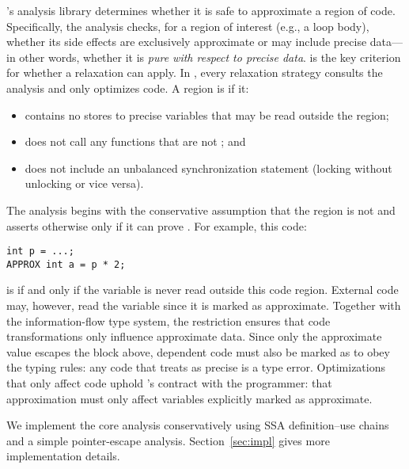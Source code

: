 \sysname's analysis library determines whether it is safe to approximate a
region of code.
Specifically, the \precisepurity analysis checks,
for a region of interest (e.g., a loop body), whether its side
effects are exclusively approximate or may include precise data---in other
words, whether it is \emph{pure with respect to precise data}.
%
\Precisepurity is the key criterion for whether a relaxation can
apply.  In
\sysname, every relaxation strategy consults the \precisepurity
analysis and only optimizes
\precisepure code.
%
A region is \precisepure if it:
\begin{itemize}
\item contains no stores to precise
variables that may be read outside the region;
\item does not call any functions that are not \precisepure; and
\item does not include an unbalanced synchronization statement (locking without
unlocking or vice versa).
\end{itemize}
The analysis begins with the conservative
assumption that the region is not \precisepure and asserts otherwise only if it
can prove \precisepurity.
%
For example, this code:
%
\begin{lstlisting}
int p = ...;
APPROX int a = p * 2;
\end{lstlisting}
%
is \precisepure if and only if the variable  is never read outside this
code region. External code may, however, read the variable  since it is
marked as approximate.
%
Together with the information-flow type system, the \precisepurity restriction
ensures that code transformations only influence approximate data.
Since only the approximate value  escapes the \precisepure block above,
dependent code must also be marked as  to obey the typing rules:
any code that treats  as precise is a type error.
Optimizations that only affect \precisepure code uphold \sysname's
contract with the programmer: that approximation must only affect variables
explicitly marked as approximate.

We implement the core \precisepurity analysis
conservatively using SSA definition--use chains and a simple pointer-escape
analysis.  Section~\ref{sec:impl} gives more implementation details.

\iffalse  %
Each program-relaxation strategy uses the shared \precisepurity analysis to
identify \emph{relaxation-opportunity sites:} places where the transformation
can apply. When \sysname finds an opportunity site, it registers the site along
with any relevant parameters in its catalog of such sites. The autotuner then
uses this catalog to enable a subset of relaxation opportunities and set their
parameters.  Section~\ref{sec:autotuner} describes the autotuning process in more detail.
\fi

